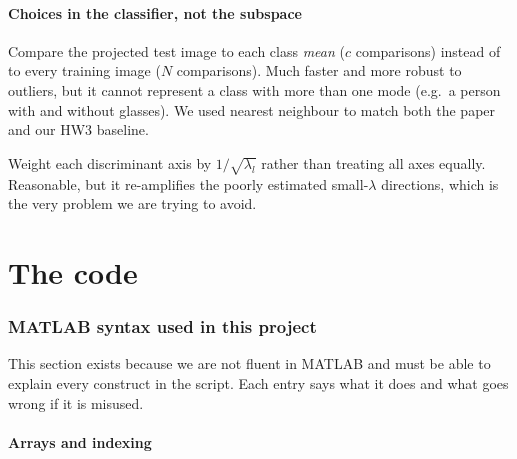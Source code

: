 \documentclass[11pt]{article}
\theoremstyle{definition}
\theoremstyle{remark}
\begin{document}
\subsection{Choices in the classifier, not the subspace}

\begin{description}[leftmargin=*,style=nextline]
\item[Nearest class centroid instead of nearest neighbour.]
  Compare the projected test image to each class \emph{mean} ($c$ comparisons)
  instead of to every training image ($N$ comparisons). Much faster and more robust
  to outliers, but it cannot represent a class with more than one mode (e.g.\ a
  person with and without glasses). We used nearest neighbour to match both the
  paper and our HW3 baseline.
\item[Mahalanobis distance in the projected space.]
  Weight each discriminant axis by $1/\sqrt{\lambda_l}$ rather than treating all
  axes equally. Reasonable, but it re-amplifies the poorly estimated small-$\lambda$
  directions, which is the very problem we are trying to avoid.
\end{description}

\part{The code}

\section{MATLAB syntax used in this project}

This section exists because we are not fluent in MATLAB and must be able to explain
every construct in the script. Each entry says what it does and what goes wrong if
it is misused.

\subsection{Arrays and indexing}
\end{document}
